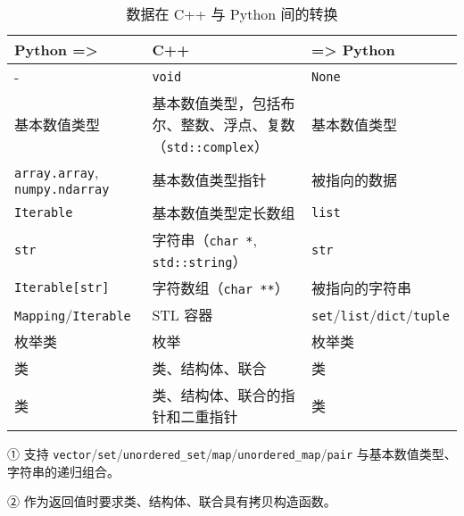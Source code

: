 \begin{table}
  \centering
  \begin{threeparttable}[c]
  \caption{数据在 C++ 与 Python 间的转换}
  \label{tab:3.2}
  \begin{tabular}{p{120pt}p{200pt}p{100pt}}
    \toprule
     Python =>                   &  C++                                                           &  => Python                 \\
    \midrule
     -                           &  \lstinline$void$                                                          &  \lstinline$None$                      \\
     基本数值类型   &  基本数值类型，包括布尔、整数、浮点、复数（\lstinline$std::complex$）  & 基本数值类型 \\
     \lstinline$array.array$, \lstinline$numpy.ndarray$  &  基本数值类型指针                                            &  被指向的数据              \\
     \lstinline$Iterable$                    &  基本数值类型定长数组                                        &  \lstinline$list$                      \\
     \lstinline$str$                         &  字符串（\lstinline$char *$, \lstinline$std::string$）                                 &  \lstinline$str$                      \\
     \lstinline$Iterable[str]$               &  字符数组（\lstinline$char **$）                                           &  被指向的字符串            \\
     \lstinline$Mapping$/\lstinline$Iterable$            &  STL 容器\tnote{①}  & \lstinline$set$/\lstinline$list$/\lstinline$dict$/\lstinline$tuple$    \\
     枚举类                      &  枚举                                                          &  枚举类                    \\
     类                          &  类、结构体、联合\tnote{②}                            &  类                        \\
     类                          &  类、结构体、联合的指针和二重指针                                    &  类                        \\
    \bottomrule
  \end{tabular}
  \begin{tablenotes}
    \item [①]  支持 \lstinline$vector$/\lstinline$set$/\lstinline$unordered_set$/\lstinline$map$/\lstinline$unordered_map$/\lstinline$pair$ 与基本数值类型、字符串的递归组合。

    \item [②]  作为返回值时要求类、结构体、联合具有拷贝构造函数。
  \end{tablenotes}
  \end{threeparttable}
\end{table}
